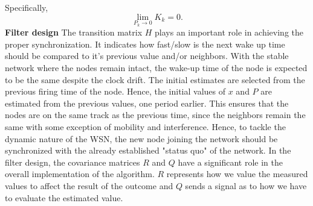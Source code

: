 \documentclass[journal]{IEEEtran}
\begin{document}
Specifically,
\begin{equation}
\mathop {\lim }\limits_{P_k \to 0 } {K_k} = 0.
\end{equation}
\textbf{Filter design} \newline
The transition matrix $H$ plays an important role in achieving
the proper synchronization. It indicates how fast/slow is the next wake up time should be compared
to it's previous value and/or neighbors. With the stable network where the nodes remain intact,
the wake-up time of the node is expected to be the same despite the
clock drift.
\newline
The initial estimates are selected from the previous firing time of the node.
Hence, the initial values of $x$ and $P$ are estimated from the previous values, one period earlier.
This ensures that the nodes are on the same track as the previous time, since the neighbors
remain the same with some exception of mobility and interference.
Hence, to tackle the dynamic nature of the WSN, the
new node joining the network should be synchronized with the already
established "status quo" of the network. 
In the filter design, the covariance matrices $R$ and $Q$ have a significant
role in the overall implementation of the algorithm. $R$ represents how
we value the measured values to affect the result of the outcome and $Q$
sends a signal as to how we have to evaluate the estimated
value.
\end{document}
